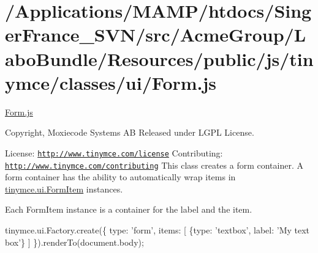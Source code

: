 \hypertarget{_2_applications_2_m_a_m_p_2htdocs_2_singer_france__s_v_n_2src_2_acme_group_2_labo_bundle_2_resoueef598a7a2300f492f416119b32dc1d4}{\section{/\+Applications/\+M\+A\+M\+P/htdocs/\+Singer\+France\+\_\+\+S\+V\+N/src/\+Acme\+Group/\+Labo\+Bundle/\+Resources/public/js/tinymce/classes/ui/\+Form.\+js}
}
\hyperlink{_form_8js}{Form.\+js}

Copyright, Moxiecode Systems A\+B Released under L\+G\+P\+L License.

License\+: \href{http://www.tinymce.com/license}{\tt http\+://www.\+tinymce.\+com/license} Contributing\+: \href{http://www.tinymce.com/contributing}{\tt http\+://www.\+tinymce.\+com/contributing} This class creates a form container. A form container has the ability to automatically wrap items in \hyperlink{classtinymce_1_1ui_1_1_form_item}{tinymce.\+ui.\+Form\+Item} instances.

Each Form\+Item instance is a container for the label and the item.

tinymce.\+ui.\+Factory.\+create(\{ type\+: 'form', items\+: \mbox{[} \{type\+: 'textbox', label\+: 'My text box'\} \mbox{]} \}).render\+To(document.\+body);


\begin{DoxyCodeInclude}
\end{DoxyCodeInclude}
 